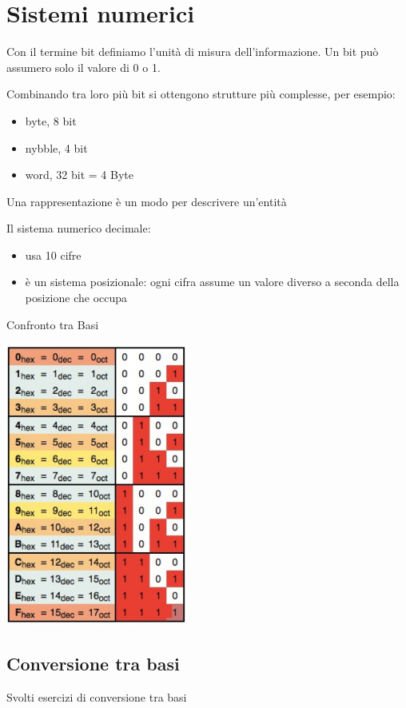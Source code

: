 \documentclass[12pt, a4paper, openany]{book}
\begin{document}

\chapter{Sistemi numerici} 

Con il termine bit definiamo l'unità di misura dell'informazione. Un bit può assumero solo il valore di 0 o 1.

Combinando tra loro più bit si ottengono strutture più complesse, per esempio:
\begin{itemize}
    \item byte, 8 bit
    \item nybble, 4 bit
    \item word, 32 bit = 4 Byte
\end{itemize}

Una rappresentazione è un modo per descrivere un'entità

Il sistema numerico decimale:

\begin{itemize}
    \item usa 10 cifre
    \item è un sistema posizionale: ogni cifra assume un valore diverso a seconda della posizione che occupa
\end{itemize}

Confronto tra Basi
\begin{center}
    \includegraphics[width=60mm,scale=0.5]{confronto_tra_basi.png}    
\end{center}

\section{Conversione tra basi}
Svolti esercizi di conversione tra basi
\end{document}
